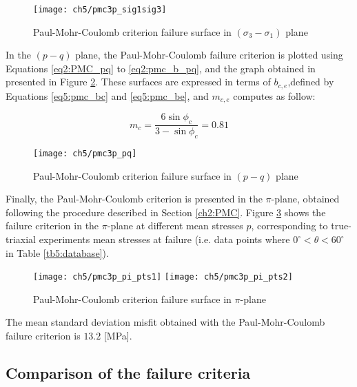 \begin{figure}[p]
    \centering
    \texttt{[image: ch5/pmc3p\_sig1sig3]}
    \caption{Paul-Mohr-Coulomb criterion failure surface in  $(\sigma_3-\sigma_1)$ plane}
    \label{fig5:pmc_sig1sig3}
\end{figure}

In the $(p-q)$ plane, the Paul-Mohr-Coulomb failure criterion is plotted using Equations \ref{eq2:PMC_pq} to \ref{eq2:pmc_b_pq}, and the graph obtained in presented in Figure \ref{fig5:pmc_pq}. These surfaces are expressed in terms of $b_{c,e}$,defined by Equations \ref{eq5:pmc_bc} and \ref{eq5:pmc_be}, and $m_{c,e}$ computes as follow: 

\begin{equation}\label{eq5:pmc_mc}
    m_c=\frac{6 \sin \phi_{c}}{3-\sin \phi_{c}} = 0.81
\end{equation}

\begin{figure}[p]
    \centering
    \texttt{[image: ch5/pmc3p\_pq]}
    \caption{Paul-Mohr-Coulomb criterion failure surface in $(p-q)$ plane}
    \label{fig5:pmc_pq}
\end{figure} 

Finally, the Paul-Mohr-Coulomb criterion is presented in the $\pi$-plane, obtained following the procedure described in Section \ref{ch2:PMC}. Figure \ref{fig5:pmc_pi_plane} shows the failure criterion in the $\pi$-plane at different mean stresses $p$, corresponding to true-triaxial experiments mean stresses at failure (i.e. data points where $0^\circ < \theta < 60^\circ$ in Table \ref{tb5:database}).

\begin{figure}[tb]
    \centering
    \texttt{[image: ch5/pmc3p\_pi\_pts1]}
    \texttt{[image: ch5/pmc3p\_pi\_pts2]}
    \caption{Paul-Mohr-Coulomb criterion failure surface in  $\pi$-plane}
    \label{fig5:pmc_pi_plane}
\end{figure} 

The mean standard deviation misfit obtained with the Paul-Mohr-Coulomb failure criterion is $13.2$ [\si{\mega\pascal}]. 

\subsection{Comparison of the failure criteria}

